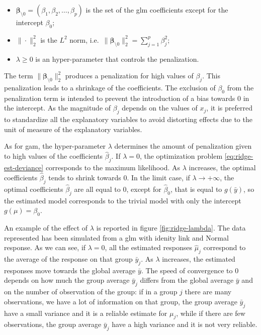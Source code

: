 \documentclass[a4paper, twoside, openright, 12pt]{report}
\providecommand{\tightlist}{%
  \setlength{\itemsep}{0pt}\setlength{\parskip}{0pt}}
\theoremstyle{definition}
\theoremstyle{definition}
\theoremstyle{definition}
\theoremstyle{remark}
\begin{document}
\begin{itemize}
\tightlist
\item
  \(\boldsymbol{\beta}_{\setminus0} = \left(\beta_1, \beta_2, \dots, \beta_p\right)\) is the set of the \ac{glm} coefficients except for the intercept \(\beta_0\);
\item
  \(\|\cdot\|_2^2\) is the \(L^2\) norm, i.e.~\(\|\boldsymbol{\beta}_{\setminus0}\|_2^2 = \sum_{j=1}^p{\beta_j^2}\);
\item
  \(\lambda\ge0\) is an hyper-parameter that controls the penalization.
\end{itemize}

The term \(\|\boldsymbol{\beta}_{\setminus0}\|_2^2\) produces a penalization for high values of \(\beta_j\). This penalization leads to a shrinkage of the coefficients.
The exclusion of \(\beta_0\) from the penalization term is intended to prevent the introduction of a bias towards \(0\) in the intercept. As the magnitude of \(\beta_j\) depends on the values of \(x_j\), it is preferred to standardize all the explanatory variables to avoid distorting effects due to the unit of measure of the explanatory variables.

As for \ac{gam}, the hyper-parameter \(\lambda\) determines the amount of penalization given to high values of the coefficients \(\hat{\beta}_j\). If \(\lambda=0\), the optimization problem \eqref{eq:ridge-est-deviance} corresponds to the maximum likelihood. As \(\lambda\) increases, the optimal coefficients \(\hat{\beta}_j\) tends to shrink towards \(0\). In the limit case, if \(\lambda\to+\infty\), the optimal coefficients \(\hat{\beta}_j\) are all equal to \(0\), except for \(\hat{\beta}_0\), that is equal to \(g(\bar{y})\), so the estimated model corresponds to the trivial model with only the intercept \(g(\mu)=\beta_0\).

An example of the effect of \(\lambda\) is reported in figure \ref{fig:ridge-lambda}. The data represented has been simulated from a \ac{glm} with idenity link and Normal response. As we can see, if \(\lambda=0\), all the estimated responses \(\hat{\mu}_j\) correspond to the average of the response on that group \(\bar{y}_j\). As \(\lambda\) increases, the estimated responses move towards the global average \(\bar{y}\). The speed of convergence to \(0\) depends on how much the group average \(\bar{y}_j\) differs from the global average \(\bar{y}\) and on the number of observation of the group: if in a group \(j\) there are many observations, we have a lot of information on that group, the group average \(\bar{y}_j\) have a small variance and it is a reliable estimate for \(\mu_j\), while if there are few observations, the group average \(\bar{y}_j\) have a high variance and it is not very reliable.
\end{document}
